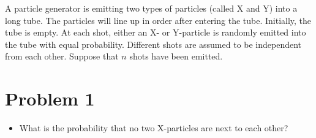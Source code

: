 A particle generator is emitting two types of particles (called X and Y) into a long tube. The particles will line up in order after entering the tube. Initially, the tube is empty. At each shot, either an X- or Y-particle is randomly emitted into the tube with equal probability. Different shots are assumed to be independent from each other. Suppose that $n$ shots have been emitted.

\section{Problem 1}

\begin{itemize}
  \item What is the probability that no two X-particles are next to each other?
\end{itemize}

